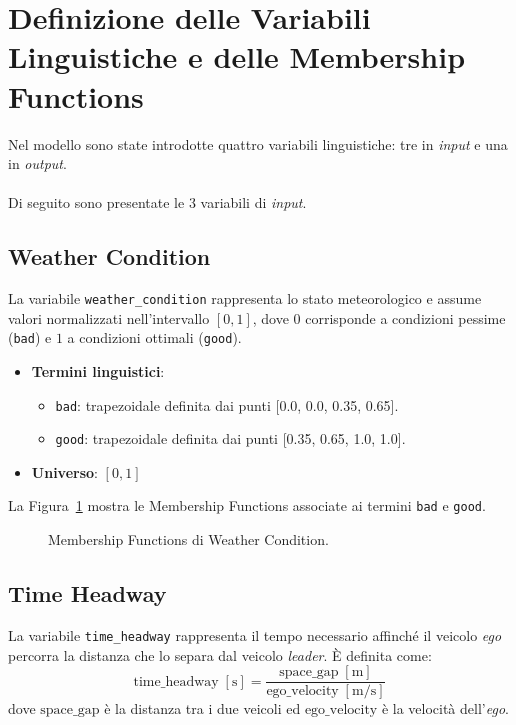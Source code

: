 \section{Definizione delle Variabili Linguistiche e delle Membership Functions}

Nel modello sono state introdotte quattro variabili linguistiche: tre in \emph{input} e una in \emph{output}.
\\\\
Di seguito sono presentate le 3 variabili di \emph{input}.

\subsection{Weather Condition}
La variabile \texttt{weather\_condition} rappresenta lo stato meteorologico e assume valori normalizzati nell'intervallo \([0,1]\), 
dove \(0\) corrisponde a condizioni pessime (\texttt{bad}) e \(1\) a condizioni ottimali (\texttt{good}).  

\begin{itemize}
  \item \textbf{Termini linguistici}:
    \begin{itemize}
      \item \texttt{bad}: trapezoidale definita dai punti [0.0, 0.0, 0.35, 0.65].
      \item \texttt{good}: trapezoidale definita dai punti  [0.35, 0.65, 1.0, 1.0].
    \end{itemize}
  \item \textbf{Universo}: \([0,1]\)
\end{itemize}

\noindent La Figura~\ref{Fig:mf_weather_condition} mostra le Membership Functions associate ai termini \texttt{bad} e \texttt{good}.

\begin{figure}[H]
    \centering
    \caption{Membership Functions di Weather Condition.}
    \label{Fig:mf_weather_condition}
\end{figure}

\subsection{Time Headway}
La variabile \texttt{time\_headway} rappresenta il tempo necessario affinché il veicolo \emph{ego} 
percorra la distanza che lo separa dal veicolo \emph{leader}. È definita come:
\[
\text{time\_headway} \; [\mathrm{s}]
= \frac{\text{space\_gap}\;[\mathrm{m}]}{\text{ego\_velocity}\;[\mathrm{m}/\mathrm{s}]}
\]
dove \(\text{space\_gap}\) è la distanza tra i due veicoli ed \emph{\(\text{ego\_velocity}\)} è la velocità dell'\emph{ego}. 
